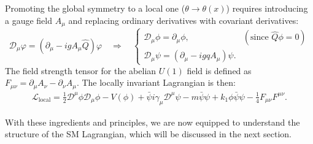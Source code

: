 Promoting the global symmetry to a local one ($\theta \to \theta(x)$) requires introducing a gauge field $A_\mu$ and replacing ordinary derivatives with covariant derivatives:
\begin{equation}
	\mathcal D_\mu\varphi=(\partial_{\mu}-i g A_\mu\hat Q )\varphi
	\quad\Longrightarrow\quad
	\begin{cases}
		\mathcal D_\mu\phi=\partial_\mu \phi, & (\text{since } \hat Q\phi=0)\\
		\mathcal D_\mu\psi=(\partial_\mu - i g q A_\mu) \psi.
	\end{cases}
\end{equation}
The field strength tensor for the abelian $U(1)$ field is defined as $F_{\mu\nu} = \partial_\mu A_\nu - \partial_\nu A_\mu$. The locally invariant Lagrangian is then:
\begin{multline}
	\mathcal L_{\text{local}}=\frac{1}{2} \mathcal D^{\mu} \phi \mathcal D_{\mu} \phi-V(\phi)
	+\bar{\psi}i \gamma_\mu  \mathcal D^{\mu} \psi - m \bar{\psi}\psi
	+ k_1 \phi\bar\psi\psi-\frac{1}{4} F_{\mu\nu}F^{\mu\nu}.
\end{multline}


With these ingredients and principles, we are now equipped to understand the structure of the SM Lagrangian, which will be discussed in the next section.

